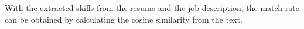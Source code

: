 With the extracted skills from the resume and the job description, the match rate can be obtained by calculating the cosine similarity from the text.


